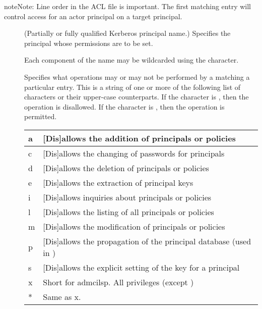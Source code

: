 \documentclass[letterpaper,10pt,english]{sphinxmanual}
\begin{document}
\begin{sphinxadmonition}{note}{Note:}
Line order in the ACL file is important.  The first matching entry
will control access for an actor principal on a target principal.
\end{sphinxadmonition}
\begin{description}
\item[{}] \leavevmode
(Partially or fully qualified Kerberos principal name.) Specifies
the principal whose permissions are to be set.

Each component of the name may be wildcarded using the \sphinxcode{*}
character.

\item[{}] \leavevmode
Specifies what operations may or may not be performed by a
 matching a particular entry.  This is a string of one or
more of the following list of characters or their upper-case
counterparts.  If the character is , then the operation
is disallowed.  If the character is , then the operation
is permitted.


\begin{savenotes}\sphinxattablestart
\centering
\begin{tabulary}{\linewidth}[t]{|T|T|}
\hline

a
&
{[}Dis{]}allows the addition of principals or policies
\\
\hline
c
&
{[}Dis{]}allows the changing of passwords for principals
\\
\hline
d
&
{[}Dis{]}allows the deletion of principals or policies
\\
\hline
e
&
{[}Dis{]}allows the extraction of principal keys
\\
\hline
i
&
{[}Dis{]}allows inquiries about principals or policies
\\
\hline
l
&
{[}Dis{]}allows the listing of all principals or policies
\\
\hline
m
&
{[}Dis{]}allows the modification of principals or policies
\\
\hline
p
&
{[}Dis{]}allows the propagation of the principal database (used in {\hyperref[\detokenize{admin/database:incr-db-prop}]{}})
\\
\hline
s
&
{[}Dis{]}allows the explicit setting of the key for a principal
\\
\hline
x
&
Short for admcilsp. All privileges (except )
\\
\hline
*
&
Same as x.
\\
\hline
\end{tabulary}
\par
\sphinxattableend\end{savenotes}

\end{description}
\end{document}
